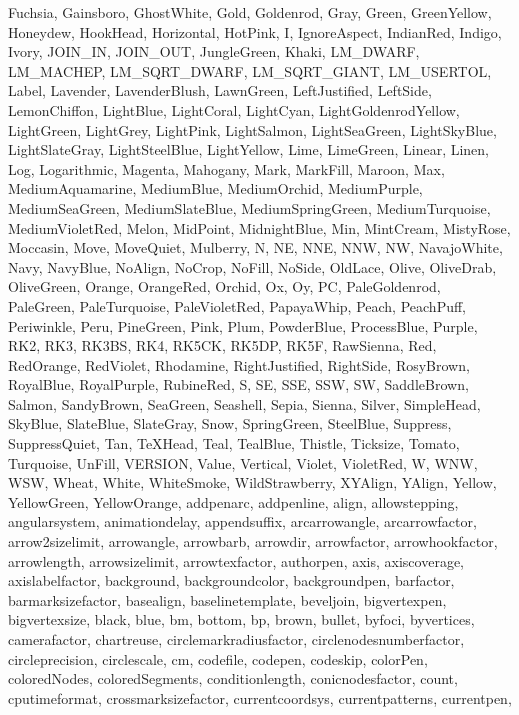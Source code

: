 {{  Fuchsia, Gainsboro, GhostWhite, Gold, Goldenrod, Gray, Green, GreenYellow,
  Honeydew, HookHead, Horizontal, HotPink, I, IgnoreAspect, IndianRed,
  Indigo, Ivory, JOIN_IN, JOIN_OUT, JungleGreen, Khaki, LM_DWARF, LM_MACHEP,
  LM_SQRT_DWARF, LM_SQRT_GIANT, LM_USERTOL, Label, Lavender, LavenderBlush,
  LawnGreen, LeftJustified, LeftSide, LemonChiffon, LightBlue, LightCoral,
  LightCyan, LightGoldenrodYellow, LightGreen, LightGrey, LightPink,
  LightSalmon, LightSeaGreen, LightSkyBlue, LightSlateGray, LightSteelBlue,
  LightYellow, Lime, LimeGreen, Linear, Linen, Log, Logarithmic, Magenta,
  Mahogany, Mark, MarkFill, Maroon, Max, MediumAquamarine, MediumBlue,
  MediumOrchid, MediumPurple, MediumSeaGreen, MediumSlateBlue,
  MediumSpringGreen, MediumTurquoise, MediumVioletRed, Melon, MidPoint,
  MidnightBlue, Min, MintCream, MistyRose, Moccasin, Move, MoveQuiet,
  Mulberry, N, NE, NNE, NNW, NW, NavajoWhite, Navy, NavyBlue, NoAlign,
  NoCrop, NoFill, NoSide, OldLace, Olive, OliveDrab, OliveGreen, Orange,
  OrangeRed, Orchid, Ox, Oy, PC, PaleGoldenrod, PaleGreen, PaleTurquoise,
  PaleVioletRed, PapayaWhip, Peach, PeachPuff, Periwinkle, Peru, PineGreen,
  Pink, Plum, PowderBlue, ProcessBlue, Purple, RK2, RK3, RK3BS, RK4, RK5CK,
  RK5DP, RK5F, RawSienna, Red, RedOrange, RedViolet, Rhodamine,
  RightJustified, RightSide, RosyBrown, RoyalBlue, RoyalPurple, RubineRed, S,
  SE, SSE, SSW, SW, SaddleBrown, Salmon, SandyBrown, SeaGreen, Seashell,
  Sepia, Sienna, Silver, SimpleHead, SkyBlue, SlateBlue, SlateGray, Snow,
  SpringGreen, SteelBlue, Suppress, SuppressQuiet, Tan, TeXHead, Teal,
  TealBlue, Thistle, Ticksize, Tomato, Turquoise, UnFill, VERSION, Value,
  Vertical, Violet, VioletRed, W, WNW, WSW, Wheat, White, WhiteSmoke,
  WildStrawberry, XYAlign, YAlign, Yellow, YellowGreen, YellowOrange,
  addpenarc, addpenline, align, allowstepping, angularsystem, animationdelay,
  appendsuffix, arcarrowangle, arcarrowfactor, arrow2sizelimit, arrowangle,
  arrowbarb, arrowdir, arrowfactor, arrowhookfactor, arrowlength,
  arrowsizelimit, arrowtexfactor, authorpen, axis, axiscoverage,
  axislabelfactor, background, backgroundcolor, backgroundpen, barfactor,
  barmarksizefactor, basealign, baselinetemplate, beveljoin, bigvertexpen,
  bigvertexsize, black, blue, bm, bottom, bp, brown, bullet, byfoci,
  byvertices, camerafactor, chartreuse, circlemarkradiusfactor,
  circlenodesnumberfactor, circleprecision, circlescale, cm, codefile,
  codepen, codeskip, colorPen, coloredNodes, coloredSegments,
  conditionlength, conicnodesfactor, count, cputimeformat,
  crossmarksizefactor, currentcoordsys, currentpatterns, currentpen,
}}
